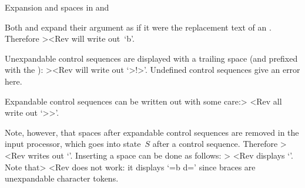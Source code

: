 \spoint Expansion and spaces in  and 

Both  and  expand their argument
as if it were the replacement text of an .
Therefore \Ver>\def\a{b}\message{\a}<Rev will
write out~`\n b'.

Unexpandable control sequences are displayed with a trailing
space (and prefixed with the ):
\Ver>\message{\hbox\vbox!}<Rev will write out
`\ver>\hbox \vbox !>'. Undefined control sequences give an error here.

Expandable control sequences can be written out with some
care:\Ver>\message{\noexpand\ifx}
\message{\string\ifx}
{\let\ifx\relax \message{\ifx}}<Rev
all write out `\ver>\ifx>'.

Note, however, that spaces after expandable control sequences
are removed in the input processor, which goes into state~$S$
after a control sequence. Therefore
\Ver>\def\a{b}\def\c{d}
\message{\a \c}<Rev writes out `'.
Inserting a space can be done as follows:
\Ver>\def\space{ } %
\message{\a\space\c}<Rev displays `'.
Note that\Ver> 
\message{\a{ }\c}<Rev does not work: it displays `\ver=b{ }d='
since braces are unexpandable character tokens.

\endinput
